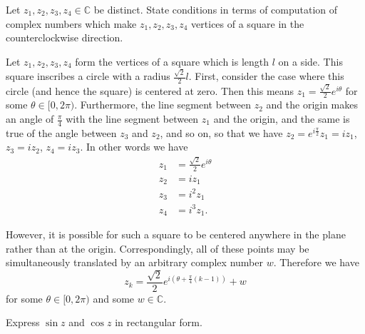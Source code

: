 \documentclass{article}
\newcounter{Problem}
\newenvironment{Problem}{\begin{Exercise}[name={Problem},
                                          counter={Problem}]}
                        {\end{Exercise}}
\begin{document}
\begin{Problem}
Let $z_1, z_2, z_3, z_4 \in \mathbb{C}$ be distinct. State
conditions in terms of computation of complex numbers which make
$z_1, z_2, z_3, z_4$ vertices of a square in the counterclockwise
direction.
\end{Problem}

\begin{Answer}
  Let $z_1, z_2, z_3, z_4$ form the vertices of a square which is
  length $l$ on a side. This square inscribes a circle with
  a radius $\frac{\sqrt{2}}{2}l$. First, consider the case where
  this circle (and hence the square) is centered at zero. Then
  this means $z_1 = \frac{\sqrt{2}}{2} e^{i \theta}$ for some
  $\theta \in [0, 2 \pi)$.
  Furthermore, the line segment between $z_2$ and the
  origin makes an angle of $\frac{\pi}{4}$ with the line segment
  between $z_1$ and the origin, and the same is true of the angle
  between $z_3$ and $z_2$, and so on, so that we have
  $z_2 = e^{i\frac{\pi}{2}} z_1 = i z_1$, $z_3 = i z_2$, $z_4 = i z_3$.
  In other words we have
  \begin{align*}
    z_1 &= \frac{\sqrt{2}}{2} e^{i \theta} \\
    z_2 &= i   z_1 \\
    z_3 &= i^2 z_1 \\
    z_4 &= i^3 z_1.
  \end{align*}

  However, it is possible for such a square to be centered anywhere in the
  plane rather than at the origin. Correspondingly, all of these points may
  be simultaneously translated by an arbitrary complex number $w$. Therefore
  we have
  $$
  z_k = \frac{\sqrt{2}}{2} e^{i (\theta + \frac{\pi}{4}(k-1))} + w
  $$
  for some $\theta \in [0, 2 \pi)$ and some $w \in \mathbb{C}$.

\end{Answer}

\begin{Problem}
Express $\sin z$ and $\cos z$ in rectangular form.
\end{Problem}
\end{document}
